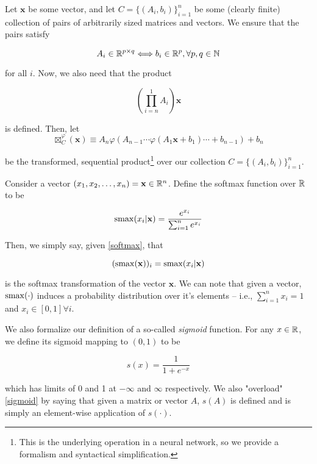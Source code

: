 Let $\mathbf{x}$ be some vector, and let $C=\{ (A_i,b_i) \}_{i=1}^{n}$ be some (clearly finite) collection of pairs of arbitrarily sized matrices and vectors. We ensure that the pairs satisfy

\begin{equation}
\label{condition on dimensions}
A_i \in\mathbb{R}^{p\times q} \Longleftrightarrow b_i\in\mathbb{R}^{p}, \forall p,q\in\mathbb{N}
\end{equation}

for all $i$. Now, we also need that the product

\begin{equation}
\label{condition on product}
(\prod_{i=n}^{1} A_i ) \mathbf{x}
\end{equation}


is defined. Then, let
\begin{equation}
\label{network_operator}
\boxtimes_{C}^{\varphi} ( \mathbf{x} ) \equiv  A_n \varphi( A_{n-1}\cdots \varphi(A_1 \mathbf{x} + b_1) \cdots + b_{n-1}) + b_{n}
\end{equation}


be the transformed, sequential product\footnote{This is the underlying operation in a neural network, so we provide a formalism and syntactical simplification.} over our collection $C=\{ (A_i,b_i) \}_{i=1}^{n}$. 

Consider a vector $(x_1,x_2,\ldots,x_n)=\mathbf{x}\in\mathbb{R}^{n}$. Define the softmax function over $\mathbb{R}$ to be 


\begin{equation}
\label{softmax}
\mathrm{smax}(x_i | \mathbf{x}) = \frac{e^{x_i}}{ \sum_{i = 1}^{n} e^{x_i} }
\end{equation}

Then, we simply say, given \eqref{softmax}, that 

$$ (\mathrm{smax}(\mathbf{x}))_i =  \mathrm{smax}(x_i | \mathbf{x})  $$

is the softmax transformation of the vector $\mathbf{x}$. We can note that given a vector, $\mathrm{smax}(\cdot)$ induces a probability distribution over it's elements -- i.e., $\sum_{i=1}^{n}x_i = 1$ and $x_i\in[0,1]\forall i$.

We also formalize our definition of a so-called \emph{sigmoid} function. For any $x\in\mathbb{R}$, we define its sigmoid mapping to $(0,1)$ to be 

\begin{equation}
\label{sigmoid}
s(x) = \frac{1}{1+e^{-x}}
\end{equation}

which has limits of 0 and 1 at $-\infty$ and $\infty$ respectively. We also "overload" \eqref{sigmoid} by saying that given a matrix or vector $A$, $s(A)$ is defined and is simply an element-wise application of $s(\cdot)$.

